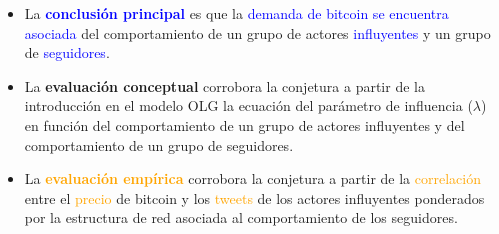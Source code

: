 \begin{frame}{}

    \vspace{5mm}
    \begin{itemize}
        \setlength\itemsep{1em}
        \item[] La \textcolor{blue}{\textbf{conclusión principal}} es que la \textcolor{blue}{demanda de bitcoin se encuentra asociada} del comportamiento de un grupo de actores \textcolor{blue}{influyentes} y un grupo de \textcolor{blue}{seguidores}.
        \item[] La \textcolor{dgreen}{\textbf{evaluación conceptual}} corrobora la conjetura a partir de la introducción en el modelo OLG la ecuación del \textcolor{dgreen}{parámetro de influencia ($\lambda$)} en función del comportamiento de un grupo de actores influyentes y del comportamiento de un grupo de seguidores. 
        \item[] La \textcolor{orange}{\textbf{evaluación empírica}} corrobora la conjetura a partir de la \textcolor{orange}{correlación} entre el \textcolor{orange}{precio} de bitcoin y los \textcolor{orange}{tweets} de los actores influyentes ponderados por la estructura de red asociada al comportamiento de los seguidores.   

    \end{itemize}

    
\end{frame}
